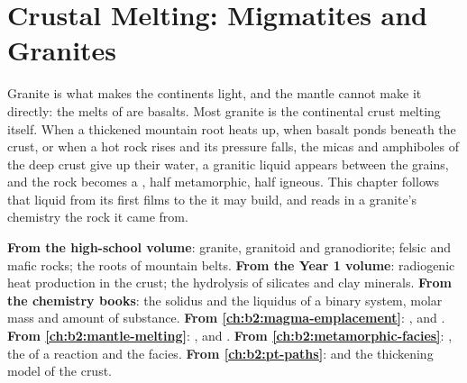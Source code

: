 \chapter{Crustal Melting: Migmatites and Granites}\label{ch:b2:crustal-melting}

Granite is what makes the continents light, and the mantle cannot make it directly: the
melts of  are basalts. Most granite is the continental crust melting itself.
When a thickened mountain root heats up, when basalt ponds beneath the crust, or when a hot
rock rises and its pressure falls, the micas and amphiboles of the deep crust give up
their water, a granitic liquid appears between the grains, and the rock becomes a
, half metamorphic, half igneous. This chapter follows that liquid from its first
films to the  it may build, and reads in a granite's chemistry the rock it came
from.

\begin{recall}
\textbf{From the high-school volume}: granite, granitoid and granodiorite; felsic and mafic
rocks; the roots of mountain belts. \textbf{From the Year 1 volume}: radiogenic heat
production in the crust; the hydrolysis of silicates and clay minerals. \textbf{From the chemistry books}: the solidus and the liquidus
of a binary system, molar mass and amount of substance. \textbf{From
\cref{ch:b2:magma-emplacement}}: ,  and . \textbf{From
\cref{ch:b2:mantle-melting}}: ,  and . \textbf{From \cref{ch:b2:metamorphic-facies}}: , the  of
a reaction and the facies. \textbf{From \cref{ch:b2:pt-paths}}:  and the
thickening model of the crust.
\end{recall}

